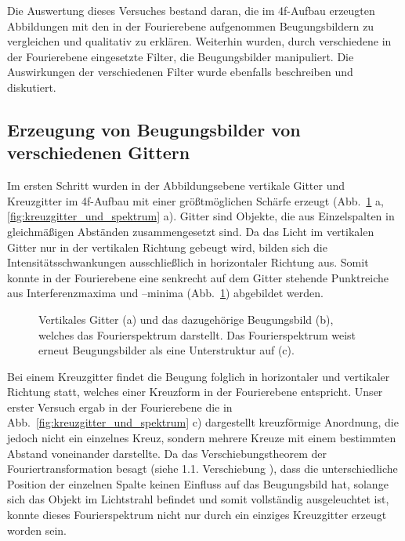 

Die Auswertung dieses Versuches bestand daran, die im 4f-Aufbau erzeugten Abbildungen mit den in der Fourierebene aufgenommen Beugungsbildern zu vergleichen und qualitativ zu erklären. Weiterhin wurden, durch verschiedene  in der Fourierebene eingesetzte Filter, die Beugungsbilder manipuliert. Die Auswirkungen der verschiedenen Filter wurde ebenfalls beschreiben und diskutiert.

\subsection{Erzeugung von Beugungsbilder von verschiedenen Gittern}

Im ersten Schritt wurden in der Abbildungsebene vertikale Gitter und Kreuzgitter im 4f-Aufbau mit einer größtmöglichen Schärfe erzeugt (Abb.~\ref{fig:gitter_und_spektrum} a, \ref{fig:kreuzgitter_und_spektrum} a). Gitter sind Objekte, die aus Einzelspalten in gleichmäßigen Abständen zusammengesetzt sind. Da das Licht im vertikalen Gitter nur in der vertikalen Richtung gebeugt wird, bilden sich die Intensitätsschwankungen ausschließlich in horizontaler Richtung aus. Somit konnte in der Fourierebene eine senkrecht auf dem Gitter stehende Punktreiche aus Interferenzmaxima und –minima (Abb.~\ref{fig:gitter_und_spektrum}) abgebildet werden.
	
\begin{figure}[ht]
	\centering
	\caption[Gitter mit Fourierspektrum]{
		Vertikales Gitter (a) und das dazugehörige Beugungsbild (b), welches das Fourierspektrum darstellt. Das Fourierspektrum weist erneut Beugungsbilder als eine Unterstruktur auf (c).
	}
	\label{fig:gitter_und_spektrum}
\end{figure}


Bei einem Kreuzgitter findet die Beugung folglich in horizontaler und vertikaler Richtung statt, welches einer Kreuzform in der Fourierebene entspricht. Unser erster Versuch ergab in
der Fourierebene die in Abb.~\ref{fig:kreuzgitter_und_spektrum} c) dargestellt kreuzförmige Anordnung, die jedoch nicht ein einzelnes Kreuz, sondern mehrere Kreuze mit einem bestimmten Abstand voneinander
darstellte. Da das Verschiebungstheorem der Fouriertransformation besagt (siehe 1.1. Verschiebung%
), dass die unterschiedliche Position der einzelnen Spalte keinen Einfluss auf das Beugungsbild hat, solange sich das Objekt im Lichtstrahl befindet und somit vollständig ausgeleuchtet ist, konnte dieses Fourierspektrum nicht nur durch ein einziges Kreuzgitter erzeugt worden sein. 

